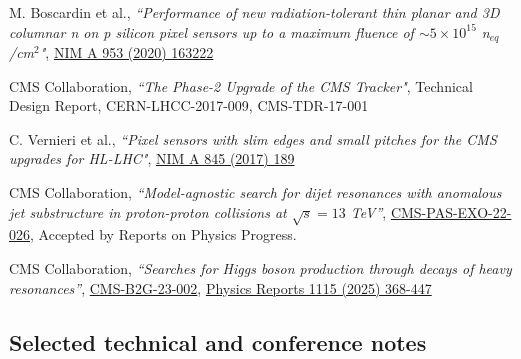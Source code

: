     
     \begin{refsection}
      \vspace{2mm}
      \onehalfspacing
 M. Boscardin et al., {\em ``Performance of new radiation-tolerant thin planar and 3D columnar n on p silicon pixel sensors up to a maximum fluence of $\sim 5 \times 10^{15}$   n$_{eq}$/cm$^2$"}, \href{https://doi.org/10.1016/j.nima.2019.163222}{NIM A 953 (2020) 163222}
     \end{refsection}
     
     
             \begin{refsection}
      \vspace{2mm}
      \onehalfspacing
  CMS Collaboration, {\sl ``The Phase-2 Upgrade of the CMS Tracker"}, Technical Design Report, CERN-LHCC-2017-009, CMS-TDR-17-001
 \end{refsection}
 
         \begin{refsection}
      \vspace{2mm}
      \onehalfspacing

 C. Vernieri et al., {\sl ``Pixel sensors with slim edges and small pitches for the CMS upgrades for HL-LHC"}, \href{http://dx.doi.org/10.1016/j.nima.2016.06.020}{NIM A 845 (2017) 189}

 \end{refsection}

\begin{refsection}
      \vspace{2mm}
      \onehalfspacing
CMS Collaboration, {\sl ``Model-agnostic search for dijet resonances with anomalous jet substructure in proton-proton collisions at $\sqrt{s}=13$ TeV''},
\href{https://cds.cern.ch/record/2892677?ln=en}{CMS-PAS-EXO-22-026},
Accepted by Reports on Physics Progress.
    \end{refsection}  
  
\begin{refsection}
      \vspace{2mm}
      \onehalfspacing
CMS Collaboration, {\sl ``Searches for Higgs boson production through decays of heavy resonances''},
\href{https://cds.cern.ch/record/2892661}{CMS-B2G-23-002},
\href{https://www.sciencedirect.com/journal/physics-reports/vol/1115/}{Physics Reports 1115 (2025) 368-447}
    \end{refsection}



\subsection{Selected technical and conference notes}


